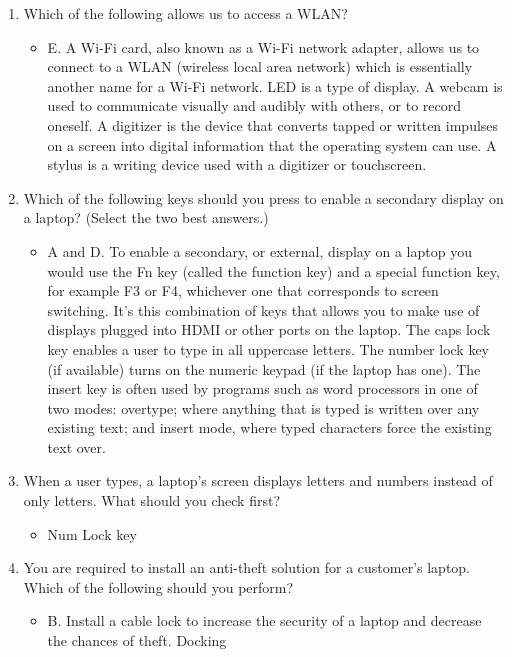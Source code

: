 \documentclass{article}
\begin{document}
\begin{enumerate}
\begin{itemize}
    \end{itemize}
    \item Which of the following allows us to access a WLAN?
    \begin{itemize}
        \item E. A Wi-Fi card, also known as a Wi-Fi network adapter, allows us to connect to a WLAN (wireless local area network) which is essentially another name for a Wi-Fi network. LED is a type of display. A webcam is used to communicate visually and audibly with others, or to record oneself. A digitizer is the device that converts tapped or written impulses on a screen into digital information that the operating system can use. A stylus is a writing device used with a digitizer or touchscreen.
    \end{itemize}
    \item Which of the following keys should you press to
enable a secondary display on a laptop? (Select the
two best answers.)
    \begin{itemize}
        \item A and D. To enable a secondary, or external,
display on a laptop you would use the Fn key
(called the function key) and a special function
key, for example F3 or F4, whichever one that
corresponds to screen switching. It’s this
combination of keys that allows you to make use
of displays plugged into HDMI or other ports on
the laptop. The caps lock key enables a user to
type in all uppercase letters. The number lock key (if available) turns on the numeric keypad (if the
laptop has one). The insert key is often used by
programs such as word processors in one of two
modes: overtype; where anything that is typed is
written over any existing text; and insert mode,
where typed characters force the existing text
over.
    \end{itemize}
    \item When a user types, a laptop’s screen displays
letters and numbers instead of only letters. What
should you check first?
    \begin{itemize}
        \item Num Lock key
    \end{itemize}
    \item You are required to install an anti-theft solution
for a customer’s laptop. Which of the following
should you perform?
    \begin{itemize}
        \item B. Install a cable lock to increase the security of a
laptop and decrease the chances of theft. Docking

\end{itemize}
\end{enumerate}
\end{document}
